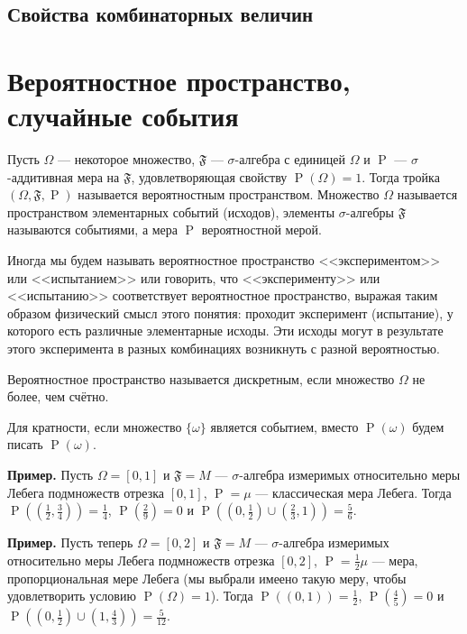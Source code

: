 \documentclass[12pt]{article}
\numberwithin{theorem}{section}
\theoremstyle{definition}
\newenvironment{example}{\indent \textbf{Пример.}}{\indent}
\newcommand{\defin}[2]{\hypertarget{#2}{{\color{red} #1}}}
\newcommand{\prob}{\operatorname{P}}
\newcommand{\events}{\mathfrak{F}}
\begin{document}
	\subsection{Свойства комбинаторных величин}
	
	\section{Вероятностное пространство, случайные события}
	
	Пусть $ \Omega $ --- некоторое множество, $ \mathfrak{F} $ --- $ \sigma $-алгебра с единицей $ \Omega $
	и $ \prob $ --- $ \sigma $-аддитивная мера на $ \mathfrak{F} $, удовлетворяющая свойству $ \prob(\Omega) = 1 $. 
	Тогда тройка $ (\Omega, \mathfrak{F}, \prob) $ называется \defin{вероятностным пространством}{prob-space}.
	Множество $ \Omega $ называется \defin{пространством элементарных событий (исходов)}{space},
	элементы $ \sigma $-алгебры $ \mathfrak{F} $ называются \defin{событиями}{event},
	а мера $ \prob $ \defin{вероятностной мерой}{probability-measure}.
	
	Иногда мы будем называть вероятностное пространство <<экспериментом>> или <<испытанием>>
	или говорить, что <<эксперименту>> или <<испытанию>> соответствует вероятностное пространство,
	выражая таким образом физический смысл этого понятия: проходит эксперимент (испытание), 
	у которого есть различные элементарные исходы. 
	Эти исходы могут в результате этого эксперимента в разных комбинациях возникнуть с разной вероятностью.
	
	Вероятностное пространство называется \defin{дискретным}{discr}, если множество $ \Omega $ не более, чем счётно.
	
	Для кратности, если множество $ \{\omega\} $ является событием, вместо $ \prob({\omega}) $ будем писать $ \prob(\omega) $.
	
	\begin{example}
		Пусть $ \Omega = [0, 1] $ и $ \events = M $ --- $ \sigma $-алгебра измеримых относительно меры Лебега
		подмножеств отрезка $ [0, 1] $, $ \prob = \mu $ --- классическая мера Лебега.
		Тогда $ \prob((\tfrac{1}{2}, \tfrac{3}{4})) = \tfrac{1}{4} $, $ \prob(\tfrac{2}{9}) = 0 $ 
		и $ \prob((0,\tfrac{1}{2}) \cup (\tfrac{2}{3}, 1)) = \tfrac{5}{6} $.
	\end{example}
	
	\begin{example}
		Пусть теперь $ \Omega = [0, 2] $ и $ \events = M $ --- $ \sigma $-алгебра измеримых относительно меры Лебега
		подмножеств отрезка $ [0, 2] $, $ \prob = \tfrac{1}{2}\mu $ --- мера, пропорциональная мере Лебега (мы выбрали имеено такую меру, чтобы удовлетворить условию $ \prob(\Omega) = 1 $).
		Тогда $ \prob((0, 1)) = \tfrac{1}{2} $, $ \prob(\tfrac{4}{5}) = 0 $ и $ \prob((0,\tfrac{1}{2}) \cup (1, \tfrac{4}{3})) = \tfrac{5}{12} $.
	\end{example}
	
\end{document}
